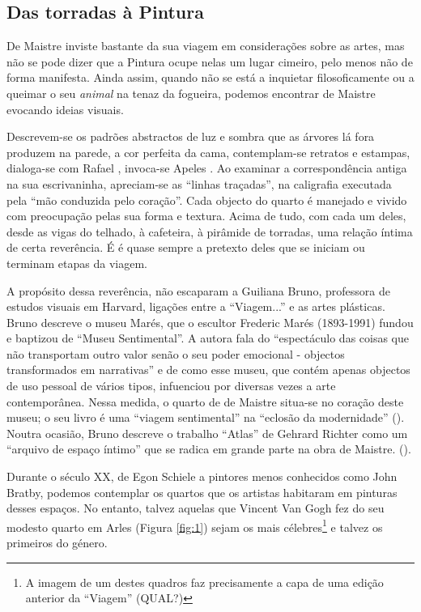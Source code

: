 \documentclass[12pt]{article}
\begin{document}
\subsection{Das torradas à Pintura}

De Maistre inviste bastante da sua viagem em considerações sobre as
artes, mas não se pode dizer que a Pintura ocupe nelas um lugar
cimeiro, pelo menos não de forma manifesta. Ainda assim, quando não se
está a inquietar filosoficamente ou a queimar o seu \emph{animal} na
tenaz da fogueira, podemos encontrar de Maistre evocando ideias
visuais.

Descrevem-se os padrões abstractos de luz e sombra que as árvores lá
fora produzem na parede, a cor perfeita da cama, contemplam-se
retratos e estampas, dialoga-se com Rafael \cite[p.xxx?]{demaistre},
invoca-se Apeles \cite[p.xxx?]{demaistre}. Ao examinar a
correspondência antiga na sua escrivaninha, apreciam-se as ``linhas
traçadas'', na caligrafia executada pela ``mão conduzida pelo
coração''. Cada objecto do quarto é manejado e vivido com preocupação
pelas sua forma e textura. Acima de tudo, com cada um deles, desde as
vigas do telhado, à cafeteira, à pirâmide de torradas, uma relação
íntima de certa reverência. É é quase sempre a pretexto deles que se
iniciam ou terminam etapas da viagem.

A propósito dessa reverência, não escaparam a Guiliana Bruno,
professora de estudos visuais em Harvard, ligações entre a
``Viagem...'' e as artes plásticas. Bruno descreve o museu Marés, que
o escultor Frederic Marés (1893-1991) fundou e baptizou de ``Museu
Sentimental''. A autora fala do ``espectáculo das coisas que não
transportam outro valor senão o seu poder emocional - objectos
transformados em narrativas'' e de como esse museu, que contém apenas
objectos de uso pessoal de vários tipos, infuenciou por diversas vezes
a arte contemporânea. Nessa medida, o quarto de de Maistre situa-se no
coração deste museu; o seu livro é uma ``viagem sentimental'' na
``eclosão da modernidade'' (\cite[p.133]{bruno2002atlas}). Noutra
ocasião, Bruno descreve o trabalho ``Atlas'' de Gehrard Richter como
um ``arquivo de espaço íntimo'' que se radica em grande parte na obra
de Maistre. (\cite[p.254]{bruno2002atlas}).

Durante o século XX, de Egon Schiele a pintores menos conhecidos como
John Bratby, podemos contemplar os quartos que os artistas habitaram
em pinturas desses espaços. No entanto, talvez aquelas que Vincent Van
Gogh fez do seu modesto quarto em Arles (Figura \ref{fig:1}) sejam os
mais célebres\footnote{A imagem de um destes quadros faz precisamente
  a capa de uma edição anterior da ``Viagem'' (QUAL?)} e talvez os
primeiros do género. 
\end{document}
